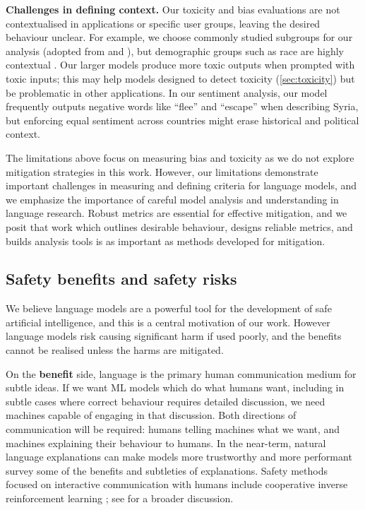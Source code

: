 \textbf{Challenges in defining context.} Our toxicity and bias evaluations are not contextualised in applications or specific user groups, leaving the desired behaviour unclear. For example, we choose commonly studied subgroups for our analysis (adopted from \cite{gpt3} and \cite{huang2020reducing}), but demographic groups such as race are highly contextual \citep{Hanna_2020}. Our larger models produce more toxic outputs when prompted with toxic inputs; this may help models designed to detect toxicity (\autoref{sec:toxicity}) but be problematic in other applications. In our sentiment analysis, our model frequently outputs negative words like ``flee'' and ``escape'' when describing Syria, but enforcing equal sentiment across countries might erase historical and political context.

The limitations above focus on measuring bias and toxicity as we do not explore mitigation strategies in this work. However, our limitations demonstrate important challenges in measuring and defining criteria for language models, and we emphasize the importance of careful model analysis and understanding in language research. Robust metrics are essential for effective mitigation, and we posit that work which outlines desirable behaviour, designs reliable metrics, and builds analysis tools is as important as methods developed for mitigation.

\subsection{Safety benefits and safety risks}
\label{discussion:safety_benefits_and_risks}
We believe language models are a powerful tool for the development of safe artificial intelligence, and this is a central motivation of our work.  However language models risk causing significant harm if used poorly, and the benefits cannot be realised unless the harms are mitigated. 

On the \textbf{benefit} side, language is the primary human communication medium for subtle ideas.  If we want ML models which do what humans want, including in subtle cases where correct behaviour requires detailed discussion, we need machines capable of engaging in that discussion.  Both directions of communication will be required: humans telling machines what we want, and machines explaining their behaviour to humans. In the near-term, natural language explanations can make models more trustworthy \citep{camburu2018snli} and more performant
\cite{rajani2019explain, coyle2020explaining,kasirzadeh2021reasons} survey some of the benefits and subtleties of explanations. Safety methods focused on interactive communication with humans include cooperative inverse reinforcement learning \citep{hadfield2016cooperative}; see \cite{russell2020compatible} for a broader discussion.

